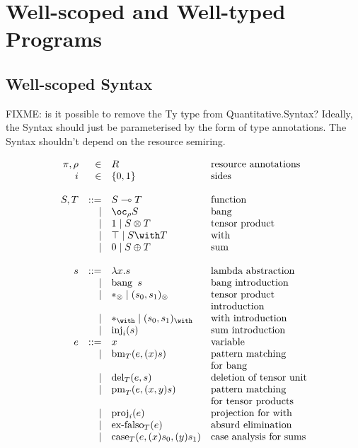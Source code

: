 \documentclass[sigplan,review]{acmart}\settopmatter{printfolios=true,printccs=false,printacmref=false}
\newcommand{\fun}[2]{#1 \multimap #2}
\newcommand{\lam}[2]{\lambda #1. #2}
\newcommand{\excl}[2]{\oc_{#1} #2}
\newcommand{\bang}[1]{\operatorname{bang}\ #1}
\newcommand{\bm}[3]{\operatorname{bm}_{#1}(#2, #3)}
\newcommand{\tensorOne}[0]{1}
\newcommand{\unit}[0]{{*}_\otimes}
\newcommand{\del}[3]{\operatorname{del}_{#1}(#2, #3)}
\newcommand{\tensor}[2]{#1 \otimes #2}
\newcommand{\ten}[2]{(#1, #2)_{\otimes}}
\newcommand{\prm}[3]{\operatorname{pm}_{#1}(#2, #3)}
\newcommand{\withTOne}[0]{\top}
\newcommand{\eat}[0]{{*}_{\with}}
\newcommand{\withT}[2]{#1 \with #2}
\newcommand{\wth}[2]{(#1, #2)_{\with}}
\newcommand{\proj}[2]{\operatorname{proj}_{#1}(#2)}
\newcommand{\sumTZero}[0]{0}
\newcommand{\exf}[2]{\operatorname{ex-falso}_{#1}(#2)}
\newcommand{\sumT}[2]{#1 \oplus #2}
\newcommand{\inj}[2]{\operatorname{inj}_{#1}(#2)}
\newcommand{\cse}[4]{\operatorname{case}_{#1}(#2, #3, #4)}
\newcommand{\bind}[2]{(#1)#2}
\begin{document}
\section{Well-scoped and Well-typed Programs}

\subsection{Well-scoped Syntax}

FIXME: is it possible to remove the Ty type from Quantitative.Syntax?
Ideally, the Syntax should just be parameterised by the form of type
annotations. The Syntax shouldn't depend on the resource semiring.

\begin{displaymath}
  \begin{array}{rrll}
    \pi,\rho & \in & R & \textrm{resource annotations} \\
    i & \in & \{0,1\} & \textrm{sides}
    \\\\
    S,T &  ::= & \fun{S}{T}                    & \textrm{function} \\
        & \mid & \excl{\rho}{S}                & \textrm{bang} \\
        & \mid & \tensorOne \mid \tensor{S}{T} & \textrm{tensor product} \\
        & \mid & \withTOne \mid \withT{S}{T}   & \textrm{with} \\
        & \mid & \sumTZero \mid \sumT{S}{T}    & \textrm{sum}
    \\\\
    s &  ::= & \lam{x}{s} & \textrm{lambda abstraction} \\
      & \mid & \bang{s} & \textrm{bang introduction} \\
      & \mid & \unit \mid \ten{s_0}{s_1} & \textrm{tensor product} \\
      &      &                           & \textrm{introduction} \\
      & \mid & \eat \mid \wth{s_0}{s_1} & \textrm{with introduction} \\
      & \mid & \inj{i}{s} & \textrm{sum introduction}
    \\
    e &  ::= & x & \textrm{variable} \\
      & \mid & \bm{T}{e}{\bind{x}{s}}  & \textrm{pattern matching} \\
      &      &                         & \textrm{for bang} \\
      & \mid & \del{T}{e}{s} & \textrm{deletion of tensor unit} \\
      & \mid & \prm{T}{e}{\bind{x,y}{s}} & \textrm{pattern matching} \\
      &      &                           & \textrm{for tensor products} \\
      & \mid & \proj{i}{e} & \textrm{projection for with} \\
      & \mid & \exf{T}{e} & \textrm{absurd elimination} \\
      & \mid & \cse{T}{e}{\bind{x}{s_0}}{\bind{y}{s_1}}
                       & \textrm{case analysis for sums}
  \end{array}
\end{displaymath}
\end{document}
